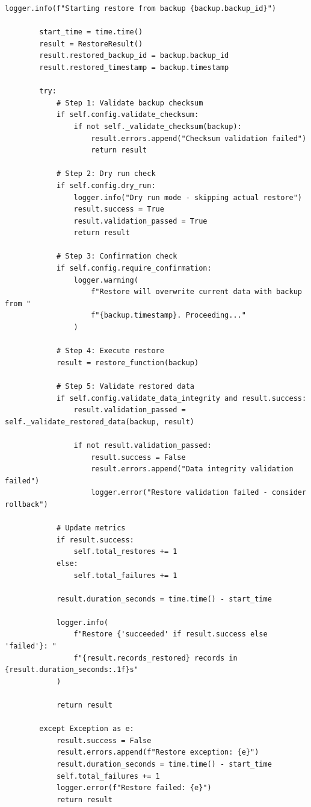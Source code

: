 \begin{lstlisting}[style=python, caption={Restore Manager with Validation}]
        logger.info(f"Starting restore from backup {backup.backup_id}")

        start_time = time.time()
        result = RestoreResult()
        result.restored_backup_id = backup.backup_id
        result.restored_timestamp = backup.timestamp

        try:
            # Step 1: Validate backup checksum
            if self.config.validate_checksum:
                if not self._validate_checksum(backup):
                    result.errors.append("Checksum validation failed")
                    return result

            # Step 2: Dry run check
            if self.config.dry_run:
                logger.info("Dry run mode - skipping actual restore")
                result.success = True
                result.validation_passed = True
                return result

            # Step 3: Confirmation check
            if self.config.require_confirmation:
                logger.warning(
                    f"Restore will overwrite current data with backup from "
                    f"{backup.timestamp}. Proceeding..."
                )

            # Step 4: Execute restore
            result = restore_function(backup)

            # Step 5: Validate restored data
            if self.config.validate_data_integrity and result.success:
                result.validation_passed = self._validate_restored_data(backup, result)

                if not result.validation_passed:
                    result.success = False
                    result.errors.append("Data integrity validation failed")
                    logger.error("Restore validation failed - consider rollback")

            # Update metrics
            if result.success:
                self.total_restores += 1
            else:
                self.total_failures += 1

            result.duration_seconds = time.time() - start_time

            logger.info(
                f"Restore {'succeeded' if result.success else 'failed'}: "
                f"{result.records_restored} records in {result.duration_seconds:.1f}s"
            )

            return result

        except Exception as e:
            result.success = False
            result.errors.append(f"Restore exception: {e}")
            result.duration_seconds = time.time() - start_time
            self.total_failures += 1
            logger.error(f"Restore failed: {e}")
            return result


\end{lstlisting}
